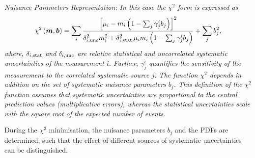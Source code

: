 \begin{description}
\item \it{Nuisance Parameters Representation:} \rm
In this case the $\chi^2$ form is expressed as
\label{sec:nuisance_representation}
\begin{equation} 
    \chi^2\left(\boldsymbol{m},\boldsymbol{b}\right) =   
 \sum_i \frac{\left[ {\mu_i} - m_i \left( 1 - \sum_j \gamma^i_j b_j \right) \right]^2}
{ \textstyle \delta^2_{i,{\rm unc}}m_i^2 + \delta^2_{i,{\rm stat}}\, {\mu_i} m_i \left(1 - \sum_j \gamma^i_j b_j\right) }
  + \sum_j b^2_j,
\label{eq:aven}
\end{equation}
%
where, $\delta_{i,\rm stat}$ and $\delta_{i,\rm unc}$ are 
relative statistical and uncorrelated systematic uncertainties
of the measurement $i$.
Further, $\gamma^i_j$ quantifies the sensitivity of the
measurement to the correlated systematic source $j$. 
The function $\chi^2$ depends in addition on
 the set of systematic nuisance parameters $b_j$.
This definition of the $\chi^2$ function assumes that
systematic uncertainties are proportional to the central prediction values
(multiplicative errors), whereas the statistical uncertainties scale 
with the square root of the expected number of events. 

During the $\chi^2$ minimisation, the nuisance parameters $b_j$ and the PDFs are determined, such that the effect of different sources of systematic uncertainties can be distinguished.
\\


\end{description}
